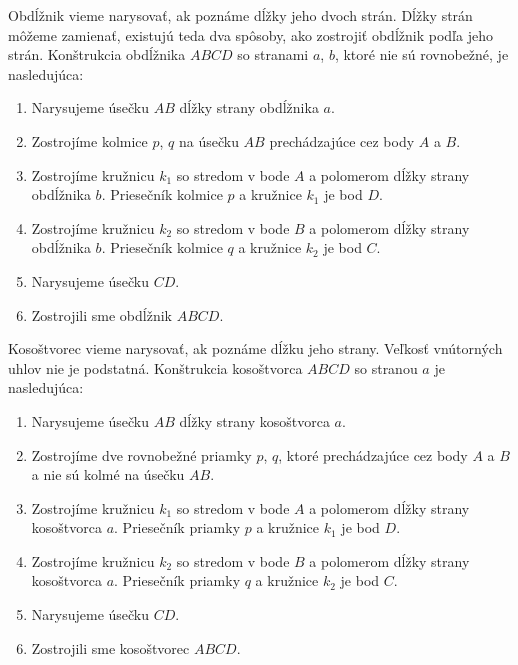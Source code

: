 \documentclass{article}
\begin{document}
Obdĺžnik vieme narysovať, ak poznáme dĺžky jeho dvoch strán. Dĺžky strán môžeme zamienať, existujú teda dva spôsoby, ako zostrojiť obdĺžnik podľa jeho strán. Konštrukcia obdĺžnika \(ABCD\) so stranami \(a\), \(b\), ktoré nie sú rovnobežné, je nasledujúca:
\begin{enumerate}[label=\arabic*)]
  \item Narysujeme úsečku \(AB\) dĺžky strany obdĺžnika \(a\).
  \item Zostrojíme kolmice \(p\), \(q\) na úsečku \(AB\) prechádzajúce cez body \(A\) a \(B\).
  \item Zostrojíme kružnicu \(k_1\) so stredom v bode \(A\) a polomerom dĺžky strany obdĺžnika \(b\). Priesečník kolmice \(p\) a kružnice \(k_1\) je bod \(D\).
  \item Zostrojíme kružnicu \(k_2\) so stredom v bode \(B\) a polomerom dĺžky strany obdĺžnika \(b\). Priesečník kolmice \(q\) a kružnice \(k_2\) je bod \(C\).
  \item Narysujeme úsečku \(CD\).
  \item Zostrojili sme obdĺžnik \(ABCD\).
\end{enumerate}

Kosoštvorec vieme narysovať, ak poznáme dĺžku jeho strany. Veľkosť vnútorných uhlov nie je podstatná. Konštrukcia kosoštvorca \(ABCD\) so stranou \(a\) je nasledujúca:
\begin{enumerate}[label=\arabic*)]
  \item Narysujeme úsečku \(AB\) dĺžky strany kosoštvorca \(a\).
  \item Zostrojíme dve rovnobežné priamky \(p\), \(q\), ktoré prechádzajúce cez body \(A\) a \(B\) a nie sú kolmé na úsečku \(AB\).
  \item Zostrojíme kružnicu \(k_1\) so stredom v bode \(A\) a polomerom dĺžky strany kosoštvorca \(a\). Priesečník priamky \(p\) a kružnice \(k_1\) je bod \(D\).
  \item Zostrojíme kružnicu \(k_2\) so stredom v bode \(B\) a polomerom dĺžky strany kosoštvorca \(a\). Priesečník priamky \(q\) a kružnice \(k_2\) je bod \(C\).
  \item Narysujeme úsečku \(CD\).
  \item Zostrojili sme kosoštvorec \(ABCD\).
\end{enumerate}
\end{document}
